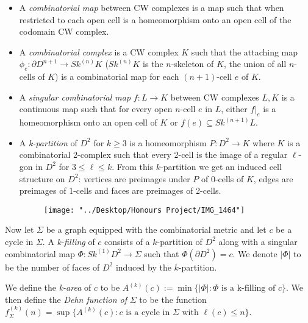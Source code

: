 \documentclass[12pt]{article}
\newcommand{\vs}{\vskip10pt}
\begin{document}
	\begin{itemize}
		\item A \textit{combinatorial map} between CW complexes is a map such that when restricted to each open cell is a homeomorphism onto an open cell of the codomain CW complex. 
		\item A \textit{combinatorial complex} is a CW complex $K$ such that the attaching map $\phi_e: \partial D^{n+1} \rightarrow Sk^{(n)}K$ ($Sk^{(n)}K$ is the $n$-skeleton of $K$, the union of all $n$-cells of $K$) is a combinatorial map for each $(n+1)$-cell $e$ of $K$. 
		\item A \textit{singular combinatorial map} $f: L \rightarrow K$ between CW complexes $L,K$ is a continuous map such that for every open $n$-cell $e$ in $L$, either $f \vert_e$ is a homeomorphism onto an open cell of $K$ or $f(e) \subseteq Sk^{(n+1)} L$. 
		\item A \textit{k-partition} of $D^2$ for $k \geq 3$ is a homeomorphism $P: D^2 \rightarrow K$ where $K$ is a combinatorial 2-complex such that every 2-cell is the image of a regular $\ell$-gon in $D^2$ for $3 \leq \ell \leq k$. From this $k$-partition we get an induced cell structure on $D^2$: vertices are preimages under $P$ of 0-cells of $K$, edges are preimages of 1-cells and faces are preimages of 2-cells. 
		
\begin{figure} [h]
	\centering
	\texttt{[image: "../Desktop/Honours Project/IMG\_1464"]}
	\caption{}
	\label{fig:img1464}
\end{figure}
		
	\end{itemize} 

	Now let $\Sigma$ be a graph equipped with the combinatorial metric and let $c$ be a cycle in $\Sigma$. A \textit{k-filling} of $c$ consists of a $k$-partition of $D^2$ along with a singular combinatorial map $\Phi: Sk^{(1)} D^2 \rightarrow \Sigma$ such that $\Phi(\partial D^2) = c$. We denote $\vert \Phi \vert$ to be the number of faces of $D^2$ induced by the $k$-partition. 
	
	\vs 
	
	We define the \textit{k-area} of $c$ to be $A^{(k)}(c) := \min \{ \vert \Phi \vert : \Phi \text{ is a k-filling of } c\}$. We then define the \textit{Dehn function of } $\Sigma$ to be the function $f^{(k)}_ {\Sigma} (n) = \sup \{A^{(k)}(c) : c \text{ is a cycle in } \Sigma \text{ with }\ell(c) \leq n\}$. 
	
	\vs 
	
\end{document}
